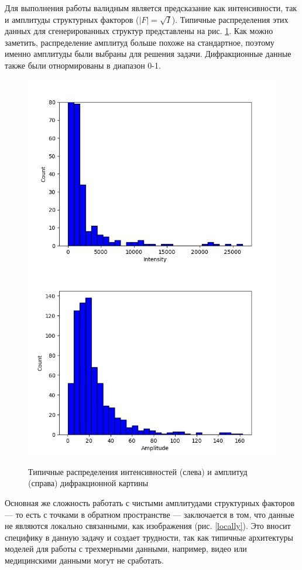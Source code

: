 \documentclass[a4paper,12pt]{article}
\begin{document}
{Для выполнения работы валидным является предсказание как интенсивности, так и амплитуды структурных факторов ($|F| = \sqrt{I}$). Типичные распределения этих данных для сгенерированных структур представлены на рис. \ref{F_dist}. Как можно заметить, распределение амплитуд больше похоже на стандартное, поэтому именно амплитуды были выбраны для решения задачи. Дифракционные данные также были отнормированы в диапазон 0-1.

\begin{figure}[ht!]
            \includegraphics[width=.5\textwidth]{F2_distribution.png}\hfill
            \includegraphics[width=.5\textwidth]{F_distribution.png}
            \caption{Типичные распределения интенсивностей (слева) и амплитуд (справа) дифракционной картины}
            \label{F_dist}
\end{figure}

Основная же сложность работать с чистыми амплитудами структурных факторов --- то есть с точками в обратном пространстве --- заключается в том, что данные не являются локально связанными, как изображения (рис. \ref{locally}). Это вносит специфику в данную задачу и создает трудности, так как типичные архитектуры моделей для работы с трехмерными данными, например, видео или медицинскими данными \cite{mrt} могут не сработать.

}
\end{document}
